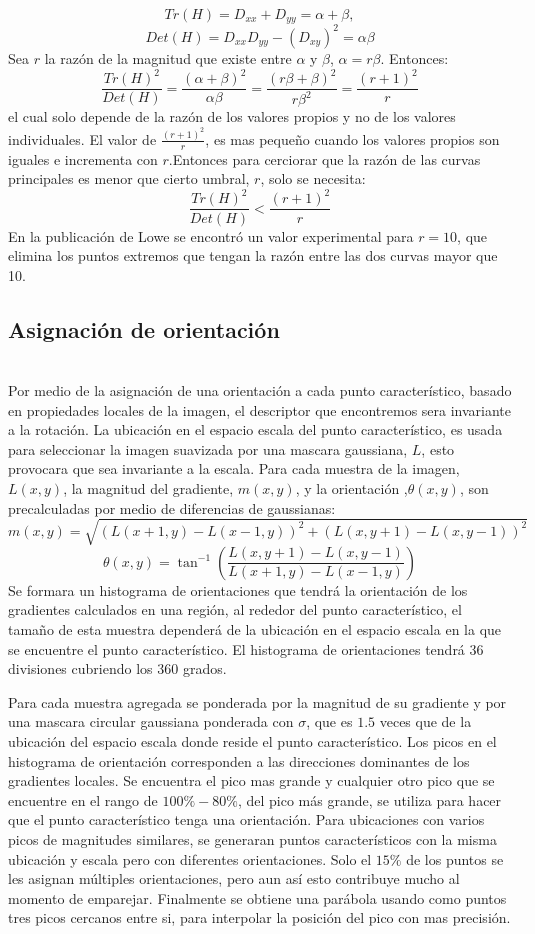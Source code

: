 		$$Tr(H) = D_{xx} + D_{yy} = \alpha+\beta,$$ $$Det(H) = D_{xx}D_{yy}-(D_{xy})^2= \alpha\beta$$
		Sea $r$ la razón de la magnitud que existe entre $\alpha$ y $\beta$, $\alpha = r\beta$. Entonces:
		$$\frac{Tr(H)^2}{Det(H)}= \frac{(\alpha+\beta)^2}{\alpha\beta}= \frac{(r\beta+\beta)^2}{r\beta^2}= \frac{(r+1)^2}{r}$$
		el cual solo depende de la razón de los valores propios y no de los valores individuales. El valor de $\frac{(r+1)^2}{r}$, es mas pequeño cuando los valores propios son iguales e incrementa con $r$.Entonces para cerciorar que la razón de las curvas principales es menor que cierto umbral, $r$, solo se necesita:
		$$\frac{Tr(H)^2}{Det(H)} < \frac{(r+1)^2}{r}$$
		En la publicación de Lowe \cite{Lowe2004} se encontró un valor experimental para $r=10$, que elimina los puntos extremos que tengan la razón entre las dos curvas mayor que 10.
	
	
	\subsection{Asignación de orientación} \hfill \\
		Por medio de la asignación de una orientación a cada punto característico, basado en propiedades locales de la imagen, el descriptor que encontremos sera invariante a la rotación. La ubicación en el espacio escala del punto característico, es usada para seleccionar la imagen suavizada por una mascara gaussiana, $L$, esto provocara que sea invariante a la escala. Para cada muestra de la imagen, $L(x,y)$, la magnitud del gradiente, $m(x,y)$, y la orientación ,$\theta(x,y)$, son precalculadas por medio de diferencias de gaussianas:
  		$$m(x,y) = \sqrt{ (L(x+1,y)-L(x-1,y))^2 + (L(x,y+1)-L(x,y-1))^2 }$$		
		$$\theta(x,y) =  \tan^{-1} \left(\frac{L(x,y+1)-L(x,y-1)}{L(x+1,y)-L(x-1,y)}\right)$$
		Se formara un histograma de orientaciones que tendrá la orientación de los gradientes calculados en una región, al rededor del punto característico, el tamaño de esta muestra dependerá de la ubicación en el espacio escala en la que se encuentre el punto característico. El histograma de orientaciones tendrá 36 divisiones cubriendo los 360 grados.
		
		Para cada muestra agregada se ponderada por la magnitud de su gradiente y por una mascara circular gaussiana ponderada con $\sigma$, que es $1.5$ veces que de la ubicación del espacio escala donde reside el punto característico.
		Los picos en el histograma de orientación corresponden a las direcciones dominantes de los gradientes locales. Se encuentra el pico mas grande y cualquier otro pico que se encuentre en el rango de $100\% - 80\%$, del pico más grande, se utiliza para hacer que el punto característico tenga una orientación. Para ubicaciones con varios picos de magnitudes similares, se generaran puntos característicos con la misma ubicación y escala pero con diferentes orientaciones. Solo el $15\%$ de los puntos se les asignan múltiples orientaciones, pero aun así esto contribuye mucho al momento de emparejar. Finalmente se obtiene una parábola usando como puntos tres picos cercanos entre si, para interpolar la posición del pico con mas precisión.  
	
